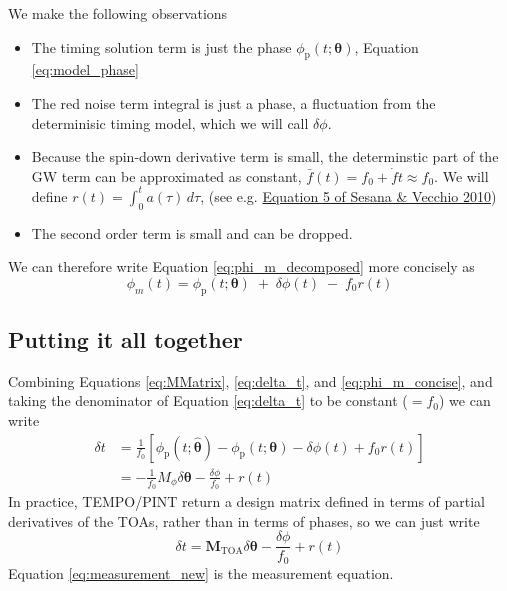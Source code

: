 \documentclass{tufte-handout} %
\begin{document}
We make the following observations
\begin{itemize}
	\item The timing solution term is just the phase 	$\phi_{\text{p}}(t;\boldsymbol{\theta})$, Equation \eqref{eq:model_phase}
	\item The red noise term integral is just a phase, a fluctuation from the determinisic timing model, which we will call $\delta \phi$.
	\item Because the spin-down derivative term is small, the determinstic part of the GW term can be approximated as constant, $\bar{f}(t) = f_0 + \dot{f} t \approx f_0$. We will define $r(t) =\int_{0}^{t} a(\tau) \,d\tau $, (see e.g. \href{https://arxiv.org/abs/1003.0677}{Equation 5 of Sesana \& Vecchio 2010})
	\item The second order term is small and can be dropped.
\end{itemize}
We can therefore write Equation \eqref{eq:phi_m_decomposed} more concisely as 
\begin{equation}
	\phi_m(t)
	= \phi_{\text{p}}(t;\boldsymbol{\theta})
	\;+\;
	\delta \phi(t)
	\;-\;
	f_0 r(t) \label{eq:phi_m_concise}
\end{equation}

\subsection{Putting it all together}
Combining Equations \eqref{eq:MMatrix}, \eqref{eq:delta_t}, and \eqref{eq:phi_m_concise}, and taking the denominator of Equation \eqref{eq:delta_t} to be constant ($=f_0$) we can write
\begin{align}
	\delta t &= \frac{1}{f_0} \left[ \phi_{\text{p}}(t;\boldsymbol{\hat{\theta}}) - \phi_{\text{p}}(t;\boldsymbol{\theta}) - \delta \phi(t) + f_0 r(t)\right] \\
	&= - \frac{1}{f_0}M_{\phi} \delta \boldsymbol{\theta} - \frac{\delta \phi}{f_0} + r(t)
\end{align}
In practice, TEMPO/PINT return a design matrix defined in terms of partial derivatives of the TOAs, rather than in terms of phases, so we can just write
\begin{equation}
	\boxed{\delta t = \boldsymbol{M}_{\text{TOA}} \delta \boldsymbol{\theta} - \frac{\delta \phi}{f_0} + r(t)} \label{eq:measurement_new}
\end{equation}
Equation \eqref{eq:measurement_new} is the measurement equation. \newline 
\end{document}
